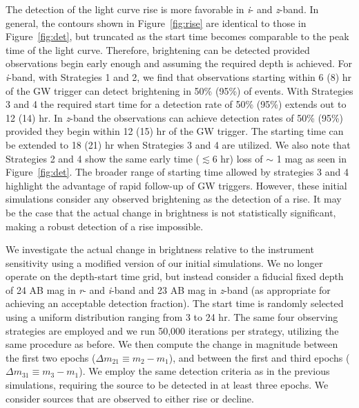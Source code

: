 The detection of the light curve rise is more favorable in {\em i}- and {\em z}-band. In general, the contours shown in Figure~\ref{fig:rise} are identical to those in Figure~\ref{fig:det}, but truncated as the start time becomes comparable to the peak time of the light curve. Therefore, brightening can be detected provided observations begin early enough and assuming the required depth is achieved. For {\em i}-band, with Strategies 1 and 2, we find that observations starting within 6 (8) hr of the GW trigger can detect brightening in 50\% (95\%) of events. With Strategies 3 and 4 the required start time for a detection rate of 50\% (95\%) extends out to 12 (14) hr. In {\em z}-band the observations can achieve detection rates of 50\% (95\%) provided they begin within 12 (15) hr of the GW trigger. The starting time can be extended to 18 (21) hr when Strategies 3 and 4 are utilized. We also note that Strategies 2 and 4 show the same early time ($\lesssim 6$ hr) loss of $\sim$ 1 mag as seen in Figure~\ref{fig:det}. The broader range of starting time allowed by strategies 3 and 4 highlight the advantage of rapid follow-up of GW triggers. However, these initial simulations consider any observed brightening as the detection of a rise. It may be the case that the actual change in brightness is not statistically significant, making a robust detection of a rise impossible. 
    
We investigate the actual change in brightness relative to the instrument sensitivity using a modified version of our initial simulations. We no longer operate on the depth-start time grid, but instead consider a fiducial fixed depth of 24 AB mag in {\em r}- and {\em i}-band and 23 AB mag in {\em z}-band (as appropriate for achieving an acceptable detection fraction). The start time is randomly selected using a uniform distribution ranging from 3 to 24 hr. The same four observing strategies are employed and we run 50,000 iterations per strategy, utilizing the same procedure as before. We then compute the change in magnitude between the first two epochs ($\Delta m_{21} \equiv m_2 - m_1$), and between the first and third epochs ($\Delta m_{31} \equiv m_3 - m_1$). We employ the same detection criteria as in the previous simulations, requiring the source to be detected in at least three epochs. We consider sources that are observed to either rise or decline.
   
